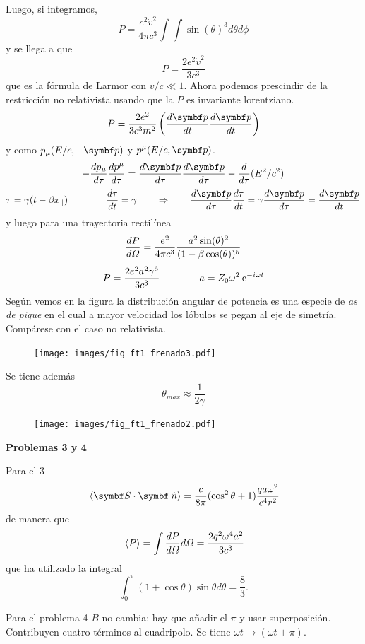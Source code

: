 \documentclass[10pt,oneside]{CBFT_book}
\begin{document}
Luego, si integramos,
\[
	P = \frac{e^2 \dot{v}^2 }{4\pi c^3} \int\int \sin(\theta)^3 d\theta d\phi
\]
y se llega a que 
\[
	P = \frac{2 e^2 \dot{v}^2 }{3 c^3}
\]
que es la fórmula de Larmor con $v/c \ll 1$. Ahora podemos prescindir de la restricción no relativista
usando que la $P$ es invariante lorentziano.
\[
	P = \frac{2 e^2}{3 c^3 m^2} \left( \dtot{\vb{p}}{t} \dtot{\vb{p}}{t} \right)
\]
y como $p_{\mu}( E/c , -\vb{p} )$ y $p^{\mu}( E/c , \vb{p} )$. 
\[
	-\dtot{p_\mu}{\tau} \dtot{p^\mu}{\tau} = \dtot{\vb{p}}{\tau} \dtot{\vb{p}}{\tau} - 
		\dtot{}{\tau}(E^2/c^2)
\]
\[
	\tau = \gamma (t-\beta x_\parallel) \qquad \qquad \dtot{\tau}{t} = \gamma \qquad \Rightarrow \qquad 
	\dtot{\vb{p}}{\tau} \dtot{\tau}{t}= \gamma \dtot{\vb{p}}{\tau} =  \dtot{\vb{p}}{t}
\]
y luego para una trayectoria rectilínea
\[
	\frac{d^{\hspace{-0.05em}} {P}}{d {\Omega}^{\hspace{-0.05em}}} = \frac{e^2}{4\pi c^3} \frac{ a^2 \sin(\theta)^2}{(1-\beta \cos(\theta))^5} 
\]
\[
	P = \frac{2 e^2 a^2 \gamma^6}{3 c^3} \qquad \qquad a = Z_0 \omega^2 \:\mathrm{e}^{-i \omega t}
\]
Según vemos en la figura la distribución angular de potencia es una especie de {\it as de pique} en el cual
a mayor velocidad los lóbulos se pegan al eje de simetría. Compárese con el caso no relativista.
\begin{figure}[htb]
	\begin{center}
	\texttt{[image: images/fig\_ft1\_frenado3.pdf]}	 
	\end{center}
	\caption{}
\end{figure} 

Se tiene además 
\[
	\theta_{max} \approx \frac{1}{2\gamma}
\]

\begin{figure}[htb]
	\begin{center}
	\texttt{[image: images/fig\_ft1\_frenado2.pdf]}	 
	\end{center}
	\caption{}
\end{figure} 

\begin{ejemplo}{\bf Problemas 3 y 4}

Para el 3
\[
	\vm{\pe{S}{\nver}} = \frac{c}{8\pi}(\cos^2\theta+1)\frac{q a \omega^2}{c^4r^2}
\]
de manera que
\[
	\:\left\langle P \right\rangle = \int \frac{d^{\hspace{-0.05em}} {P}}{d {\Omega}^{\hspace{-0.05em}}} d\Omega = \frac{2q^2\omega^4a^2}{3c^3}
\]
que ha utilizado la integral
\[
	\int_0^\pi (1+\cos\theta) \sin\theta d\theta = \frac{8}{3}.
\]

Para el problema 4 $B$ no cambia; hay que añadir el $\pi$ y usar superposición.
Contribuyen cuatro términos al cuadripolo. Se tiene $\omega t \to (\omega t + \pi )$.
 
\end{ejemplo}
\end{document}
